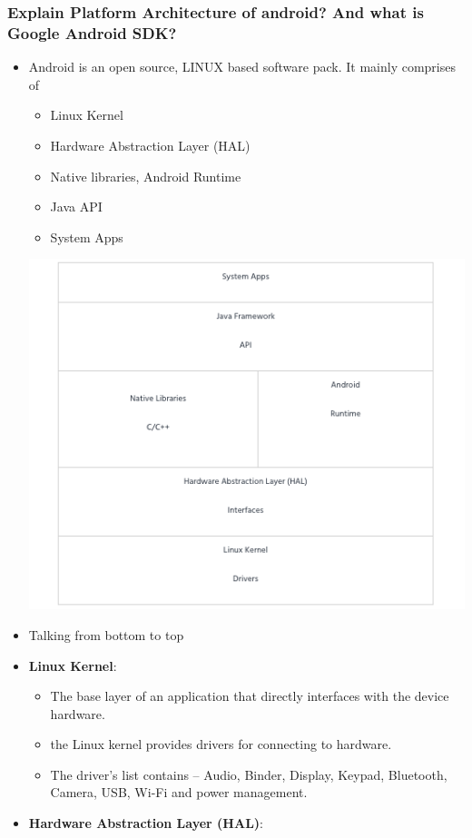 \documentclass[9pt, b5paper]{article}
\begin{document}
\subsubsection{Explain Platform Architecture of android? And what is Google Android SDK?}
\label{sec-1-1-1}
\begin{itemize}
\item Android is an open source, LINUX based software pack. It mainly comprises of 
\begin{itemize}
\item Linux Kernel
\item Hardware Abstraction Layer (HAL)
\item Native libraries, Android Runtime
\item Java API
\item System Apps
\end{itemize}
\includegraphics[width=.9\linewidth]{./pic/androidArchtecture.png}
\item Talking from bottom to top
\item \textbf{Linux Kernel}:
\begin{itemize}
\item The base layer of an application that directly interfaces with the device hardware.
\item the Linux kernel provides drivers for connecting to hardware.
\item The driver's list contains – Audio, Binder, Display, Keypad, Bluetooth, Camera, USB, Wi-Fi and power management.
\end{itemize}
\item \textbf{Hardware Abstraction Layer (HAL)}:
\begin{itemize}

\end{itemize}
\end{itemize}
\end{document}
